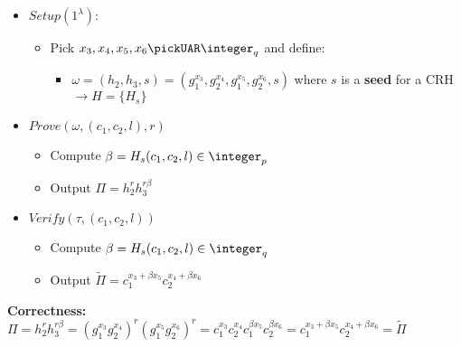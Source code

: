 \begin{itemize}
    \item $Setup(1^\lambda)$: \begin{itemize}
        \item Pick $x_3,x_4,x_5,x_6 \pickUAR \integer_q$ and define:
        \begin{itemize}
            \item $\omega=(h_2,h_3,s)=(g_1^{x_3},g_2^{x_4},g_1^{x_5},g_2^{x_6},s)$ where $s$ is a \textbf{seed} for a CRH$\rightarrow H=\{H_s\}$ %
        \end{itemize}
    \end{itemize}
    \item $Prove(\omega, (c_1,c_2,l), r)$ \begin{itemize}
        \item Compute $\beta=H_s(c_1,c_2,l)\in \integer_p$
        \item Output $\Pi=h_2^rh_3^{r\beta}$
    \end{itemize}
    \item $Verify(\tau, (c_1,c_2,l))$\begin{itemize}
        \item Compute $\beta=H_s(c_1,c_2,l)\in \integer_q$
        \item Output $\widetilde{\Pi}=c_1^{x_3+\beta x_5}c_2^{x_4+\beta x_6}$
    \end{itemize}
\end{itemize}

\noindent\textbf{Correctness:}\\ $\Pi=h_2^rh_3^{r\beta}=(g_1^{x_3}g_2^{x_4})^r(g_1^{x_5}g_2^{x_6})^r=c_1^{x_3}c_2^{x_4}c_1^{\beta x_5}c_2^{\beta x_6}=c_1^{x_3+\beta x_5}c_2^{x_4+\beta x_6}=\widetilde{\Pi}$

